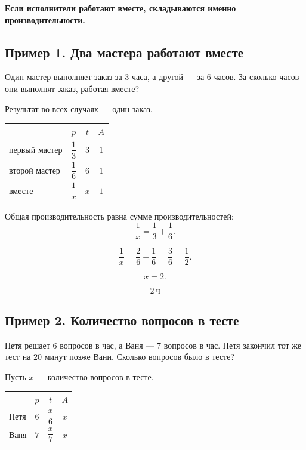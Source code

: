 \documentclass[a4paper,12pt]{article}
\newcommand{\important}[1]{\textcolor{darkaccent}{\textbf{#1}}}
\newcommand{\ch}{\text{ч}}
\begin{document}
\important{Если исполнители работают вместе, складываются именно производительности.}

\subsection{Пример 1. Два мастера работают вместе}

Один мастер выполняет заказ за $3$ часа, а другой --- за $6$ часов. За сколько часов они выполнят заказ, работая вместе?

Результат во всех случаях --- один заказ.

\begin{center}
\renewcommand{\arraystretch}{1.35}
\begin{tabularx}{0.82\linewidth}{X c c c}
\toprule
 & $p$ & $t$ & $A$ \\
\midrule
первый мастер & $\dfrac{1}{3}$ & $3$ & $1$ \\
второй мастер & $\dfrac{1}{6}$ & $6$ & $1$ \\
вместе & $\dfrac{1}{x}$ & $x$ & $1$ \\
\bottomrule
\end{tabularx}
\end{center}

Общая производительность равна сумме производительностей:
\[
\frac{1}{x}=\frac{1}{3}+\frac{1}{6}.
\]

\[
\frac{1}{x}=\frac{2}{6}+\frac{1}{6}=\frac{3}{6}=\frac{1}{2}.
\]

\[
x=2.
\]

\[
\boxed{2\ \ch}
\]

\subsection{Пример 2. Количество вопросов в тесте}

Петя решает $6$ вопросов в час, а Ваня --- $7$ вопросов в час. Петя закончил тот же тест на $20$ минут позже Вани. Сколько вопросов было в тесте?

Пусть $x$ --- количество вопросов в тесте.

\begin{center}
\renewcommand{\arraystretch}{1.35}
\begin{tabularx}{0.82\linewidth}{X c c c}
\toprule
 & $p$ & $t$ & $A$ \\
\midrule
Петя & $6$ & $\dfrac{x}{6}$ & $x$ \\
Ваня & $7$ & $\dfrac{x}{7}$ & $x$ \\
\bottomrule
\end{tabularx}
\end{center}
\end{document}
